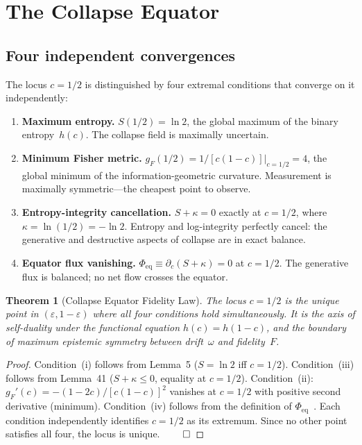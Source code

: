 \documentclass[
  aps,
  prd,
  twocolumn,
  superscriptaddress,
  nofootinbib,
  floatfix
]{revtex4-2}
\newtheorem{theorem}{Theorem}
\newcommand{\eps}{\varepsilon}
\newcommand{\gF}{g_{\!F}}
\begin{document}
\section{The Collapse Equator}\label{sec:equator}

\subsection{Four independent convergences}

The locus $c = 1/2$ is distinguished by four extremal conditions that
converge on it independently:

\begin{enumerate}[leftmargin=*,label=(\roman*)]
\item \textbf{Maximum entropy.}  $S(1/2) = \ln 2$, the global
  maximum of the binary entropy~$h(c)$.  The collapse field is
  maximally uncertain.

\item \textbf{Minimum Fisher metric.}
  $\gF(1/2) = 1/[c(1{-}c)]|_{c=1/2} = 4$, the global minimum
  of the information-geometric curvature.  Measurement is maximally
  symmetric---the cheapest point to observe.

\item \textbf{Entropy-integrity cancellation.}  $S + \kappa = 0$
  exactly at $c = 1/2$, where $\kappa = \ln(1/2) = -\ln 2$.
  Entropy and log-integrity perfectly cancel: the generative and
  destructive aspects of collapse are in exact balance.

\item \textbf{Equator flux vanishing.}
  $\Phi_{\mathrm{eq}} \equiv \partial_c(S + \kappa) = 0$ at
  $c = 1/2$.  The generative flux is balanced; no net flow crosses
  the equator.
\end{enumerate}

\begin{theorem}[Collapse Equator Fidelity Law]\label{thm:equator}
The locus $c = 1/2$ is the unique point in $(\eps, 1{-}\eps)$ where
all four conditions hold simultaneously.  It is the axis of
self-duality under the functional equation $h(c) = h(1{-}c)$, and the
boundary of maximum epistemic symmetry between drift~$\omega$ and
fidelity~$F$.
\end{theorem}

\begin{proof}
Condition~(i) follows from Lemma~5 ($S = \ln 2$ iff $c = 1/2$).
Condition~(iii) follows from Lemma~41 ($S + \kappa \leq 0$, equality
at $c = 1/2$).  Condition~(ii): $\gF'(c) = -(1-2c)/[c(1-c)]^2$
vanishes at $c = 1/2$ with positive second derivative (minimum).
Condition~(iv) follows from the definition of
$\Phi_{\mathrm{eq}}$~\cite{paulus2025equator}.  Each condition
independently identifies $c = 1/2$ as its extremum.  Since no other
point satisfies all four, the locus is unique. $\qed$
\end{proof}
\end{document}
